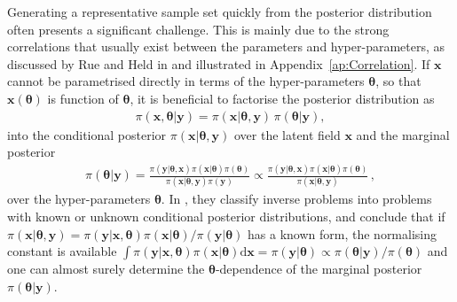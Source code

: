 Generating a representative sample set quickly from the posterior distribution often presents a significant challenge. This is mainly due to the strong correlations that usually exist between the parameters and hyper-parameters, as discussed by Rue and Held in \cite{rue2005gaussian} and illustrated in Appendix~\ref{ap:Correlation}.
If $\bm{x}$ cannot be parametrised directly in terms of the hyper-parameters $\bm{\theta}$, so that $\bm{x}(\bm{\theta})$ is function of $\bm{\theta}$, it is beneficial to factorise the posterior distribution as
\begin{align}
	\pi(\bm{x}, \bm{\theta} |  \bm{y}) = \pi(\bm{x} |  \bm{\theta}, \bm{y}) \, \pi(\bm{\theta} |   \bm{y}), \label{eq:MTC}
\end{align}
into the conditional posterior $\pi(\bm{x} |  \bm{\theta}, \bm{y})$ over the latent field $\bm{x}$ and the marginal posterior 
\begin{align}
	\pi(\bm{\theta} |   \bm{y}) =  \frac{ \pi(   \bm{y} | \bm{\theta} ,\bm{x})  \pi( \bm{x} | \bm{\theta} )  \pi(\bm{\theta}) }{ \pi(\bm{x} | \bm{\theta} ,   \bm{y})   \pi( \bm{y})} \propto \frac{ \pi(   \bm{y} | \bm{\theta} ,\bm{x})  \pi( \bm{x} | \bm{\theta} )  \pi(\bm{\theta}) }{ \pi(\bm{x} | \bm{\theta} ,   \bm{y}) } \label{eq:margGen}\, ,
\end{align}
over the hyper-parameters $\bm{\theta}$.
In \cite{norton2018sampling}, they classify inverse problems into problems with known or unknown conditional posterior distributions, and conclude that if $\pi(\bm{x} | \bm{\theta} ,   \bm{y}) = \pi(\bm{y} | \bm{x}, \bm{\theta} ) \pi(\bm{x}| \bm{\theta})  / \pi(   \bm{y}| \bm{\theta})$ has a known form, the normalising constant is available \newline $\int \pi(\bm{y} | \bm{x}, \bm{\theta} ) \pi(\bm{x}| \bm{\theta}) \text{d} \bm{x} = \pi(   \bm{y}| \bm{\theta})  \propto \pi( \bm{\theta}|\bm{y}) / \pi(\bm{\theta})$ and one can almost surely determine the $\bm{\theta}$-dependence of the marginal posterior $\pi(\bm{\theta} |   \bm{y})$.

